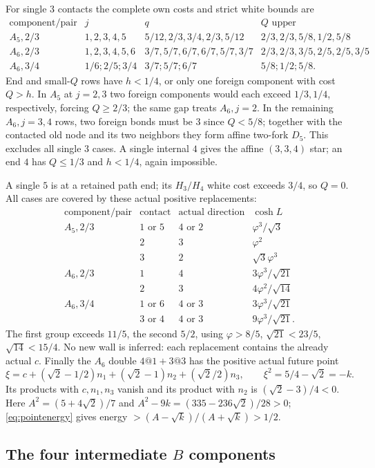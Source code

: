 \documentclass[11pt]{article}
\theoremstyle{definition}
\theoremstyle{remark}
\newcommand{\ph}{\varphi}
\begin{document}
For single $3$ contacts the complete own costs and strict white
bounds are
\[
\begin{array}{c|c|c|c}
\text{component/pair}&j&q&Q\text{ upper}\\ \hline
A_5,2/3&1,2,3,4,5&5/12,2/3,3/4,2/3,5/12&2/3,2/3,5/8,1/2,5/8\\
A_6,2/3&1,2,3,4,5,6&3/7,5/7,6/7,6/7,5/7,3/7&2/3,2/3,3/5,2/5,2/5,3/5\\
A_6,3/4&1/6;2/5;3/4&3/7;5/7;6/7&5/8;1/2;5/8.
\end{array}
\]
End and small-$Q$ rows have $h<1/4$, or only one foreign
component with cost $Q>h$. In $A_5$ at $j=2,3$ two foreign
components would each exceed $1/3,1/4$, respectively, forcing
$Q\ge2/3$; the same gap treats $A_6,j=2$.
In the remaining $A_6,j=3,4$ rows, two foreign bonds must be $3$
since $Q<5/8$; together with the contacted old node and its two
neighbors they form affine two-fork $D_5$. This excludes all single
$3$ cases. A single internal $4$ gives the affine $(3,3,4)$ star;
an end $4$ has $Q\le1/3$ and $h<1/4$, again impossible.

A single $5$ is at a retained path end; its $H_3/H_4$ white cost
exceeds $3/4$, so $Q=0$. All cases are covered by these actual
positive replacements:
\[
\begin{array}{c|c|c|c}
\text{component/pair}&\text{contact}&\text{actual direction}&\cosh L\\ \hline
A_5,2/3&1\text{ or }5&4\text{ or }2&\ph^3/\sqrt3\\
&2&3&\ph^2\\
&3&2&\sqrt3\ph^3\\
A_6,2/3&1&4&3\ph^3/\sqrt{21}\\
&2&3&4\ph^2/\sqrt{14}\\
A_6,3/4&1\text{ or }6&4\text{ or }3&3\ph^3/\sqrt{21}\\
&3\text{ or }4&4\text{ or }3&9\ph^3/\sqrt{21}.
\end{array}
\]
The first group exceeds $11/5$, the second $5/2$, using
$\ph>8/5$, $\sqrt{21}<23/5$, $\sqrt{14}<15/4$.
No new wall is inferred: each replacement contains the already
actual $c$. Finally the $A_6$ double $4@1+3@3$ has the positive
actual future point
\[
 \xi=c+(\sqrt2-1/2)n_1+(\sqrt2-1)n_2+(\sqrt2/2)n_3,
 \qquad \xi^2=5/4-\sqrt2=-k.
\]
Its products with $c,n_1,n_3$ vanish and its product with $n_2$
is $(\sqrt2-3)/4<0$. Here $A^2=(5+4\sqrt2)/7$ and
$A^2-9k=(335-236\sqrt2)/28>0$; \eqref{eq:pointenergy} gives
energy $>(A-\sqrt k)/(A+\sqrt k)>1/2$.

\subsection{The four intermediate \texorpdfstring{$B$}{B} components}
\end{document}
